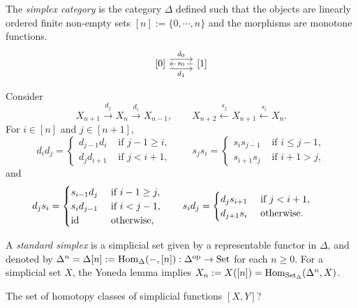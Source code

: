 \documentclass{../../large}
\begin{document}
\begin{prb}
The \emph{simplex category} is the category $\Delta$ defined such that the objects are linearly ordered finite non-empty sets $[n]:=\{0,\cdots,n\}$ and the morphisms are monotone functions.
\[\begin{tikzcd}
\left[0\right] \rar[shift left=2]{d_0}\rar[shift right=2,swap]{d_1} & \left[1\right] \lar["s_0" description]
\end{tikzcd}\]

Consider
\[X_{n+1}\xrightarrow{d_j}X_n\xrightarrow{d_i}X_{n-1},\qquad X_{n+2}\xleftarrow{s_j}X_{n+1}\xleftarrow{s_i}X_n.\]
For $i\in[n]$ and $j\in[n+1]$,
\[d_id_j=\begin{cases}d_{j-1}d_i&\text{ if }j-1\ge i,\\d_jd_{i+1}&\text{ if }j<i+1,\end{cases}\qquad
s_js_i=\begin{cases}s_is_{j-1}&\text{ if }i\le j-1,\\s_{i+1}s_j&\text{ if }i+1>j,\end{cases}\]
and
\[d_js_i=\begin{cases}s_{i-1}d_j&\text{ if }i-1\ge j,\\s_id_{j-1}&\text{ if }i<j-1,\\\operatorname{id}&\text{ otherwise},\end{cases}\qquad
s_id_j=\begin{cases}d_js_{i+1}&\text{ if }j<i+1,\\d_{j+1}s_i&\text{ otherwise}.\end{cases}\qquad\]

A \emph{standard simplex} is a simplicial set given by a representable functor in $\Delta$, and denoted by $\Delta^n=\Delta[n]:=\operatorname{Hom}_\Delta(-,[n]):\Delta^{\mathrm{op}}\to\mathrm{Set}$ for each $n\ge0$.
For a simplicial set $X$, the Yoneda lemma implies $X_n:=X([n])=\operatorname{Hom}_{\mathrm{Set}_\Delta}(\Delta^n,X)$.



The set of homotopy classes of simplicial functions $[X,Y]$?

\end{prb}
\end{document}
